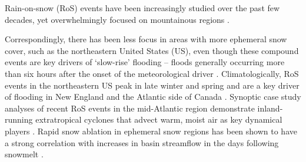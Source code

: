 \documentclass[nhess, manuscript]{copernicus}
\begin{document}

%
%
%
%


\introduction

Rain-on-snow (RoS) events have been increasingly studied over the past few decades, yet overwhelmingly focused on mountainous regions \citep{singh1997hydrological,mccabe2007rain,wayand2015modeling,sterle2019hydroclimate,musselman2018projected,poschlod2020climate,siirila2021a,heggli2022toward,yu2022diverse,brandt2022a,maina2023diverging,haleakala2023watershed}.

Correspondingly, there has been less focus in areas with more ephemeral snow cover, such as the northeastern United States (US), even though these compound events are key drivers of `slow-rise' flooding -- floods generally occurring more than six hours after the onset of the meteorological driver \citep{dougherty2021high}. 
Climatologically, RoS events in the northeastern US peak in late winter and spring \citep{ashley2008flood,villarini2010flood,dougherty2019climatology,wachowicz2020rain} and are a key driver of flooding in New England and the Atlantic side of Canada \citep{collins2014annual}. 
Synoptic case study analyses of recent RoS events in the mid-Atlantic region demonstrate inland-running extratropical cyclones that advect warm, moist air as key dynamical players \citep{grote2021synoptic}. 
Rapid snow ablation in ephemeral snow regions has been shown to have a strong correlation with increases in basin streamflow in the days following snowmelt \citep{suriano2020discharge}.
\end{document}
